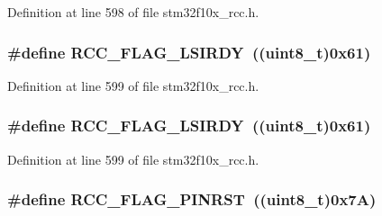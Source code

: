 Definition at line 598 of file stm32f10x\+\_\+rcc.\+h.

\subsubsection[{\texorpdfstring{R\+C\+C\+\_\+\+F\+L\+A\+G\+\_\+\+L\+S\+I\+R\+DY}{RCC_FLAG_LSIRDY}}]{\setlength{\rightskip}{0pt plus 5cm}\#define R\+C\+C\+\_\+\+F\+L\+A\+G\+\_\+\+L\+S\+I\+R\+DY~(({\bf uint8\+\_\+t})0x61)}\hypertarget{group___r_c_c___flag_ga8c5e4992314d347597621bfe7ab10d72}{}\label{group___r_c_c___flag_ga8c5e4992314d347597621bfe7ab10d72}


Definition at line 599 of file stm32f10x\+\_\+rcc.\+h.

\subsubsection[{\texorpdfstring{R\+C\+C\+\_\+\+F\+L\+A\+G\+\_\+\+L\+S\+I\+R\+DY}{RCC_FLAG_LSIRDY}}]{\setlength{\rightskip}{0pt plus 5cm}\#define R\+C\+C\+\_\+\+F\+L\+A\+G\+\_\+\+L\+S\+I\+R\+DY~(({\bf uint8\+\_\+t})0x61)}\hypertarget{group___r_c_c___flag_ga8c5e4992314d347597621bfe7ab10d72}{}\label{group___r_c_c___flag_ga8c5e4992314d347597621bfe7ab10d72}


Definition at line 599 of file stm32f10x\+\_\+rcc.\+h.

\subsubsection[{\texorpdfstring{R\+C\+C\+\_\+\+F\+L\+A\+G\+\_\+\+P\+I\+N\+R\+ST}{RCC_FLAG_PINRST}}]{\setlength{\rightskip}{0pt plus 5cm}\#define R\+C\+C\+\_\+\+F\+L\+A\+G\+\_\+\+P\+I\+N\+R\+ST~(({\bf uint8\+\_\+t})0x7\+A)}\hypertarget{group___r_c_c___flag_gabfc3ab5d4a8a94ec1c9f38794ce37ad6}{}\label{group___r_c_c___flag_gabfc3ab5d4a8a94ec1c9f38794ce37ad6}


